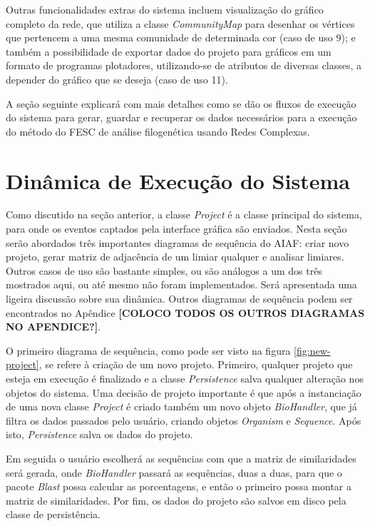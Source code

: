 Outras funcionalidades extras do sistema incluem visualização do gráfico completo da rede, que utiliza a classe \textit{CommunityMap} para desenhar
os vértices que pertencem a uma mesma comunidade de determinada cor (caso de uso 9); e também a possibilidade de exportar dados do projeto para
gráficos em um formato de programas plotadores, utilizando-se de atributos de diversas classes, a depender do gráfico que se deseja (caso de uso 11).

A seção seguinte explicará com mais detalhes como se dão os fluxos de execução do sistema para gerar, guardar e recuperar os dados necessários para a
execução do método do FESC de análise filogenética usando Redes Complexas.

\section{Dinâmica de Execução do Sistema} \label{sec:dinamica}

Como discutido na seção anterior, a classe \textit{Project} é a classe principal do sistema, para onde os eventos captados pela interface gráfica são
enviados. Nesta seção serão abordados três importantes diagramas de sequência do AIAF: criar novo projeto, gerar matriz de adjacência de um limiar qualquer
e analisar limiares. Outros casos de uso são bastante simples, ou são análogos a um dos três mostrados aqui, ou até mesmo não foram implementados. Será
apresentada uma ligeira discussão sobre sua dinâmica. Outros diagramas de sequência podem ser encontrados no Apêndice \textbf{[COLOCO TODOS OS OUTROS
DIAGRAMAS NO APENDICE?]}.

O primeiro diagrama de sequência, como pode ser visto na figura \ref{fig:new-project}, se refere à criação de um novo projeto. Primeiro, qualquer projeto
que esteja em execução é finalizado e a classe \textit{Persistence} salva qualquer alteração nos objetos do sistema. Uma decisão de projeto importante
é que após a instanciação de uma nova classe \textit{Project} é criado também um novo objeto \textit{BioHandler}, que já filtra os dados passados pelo
usuário, criando objetos \textit{Organism} e \textit{Sequence}. Após isto, \textit{Persistence} salva os dados do projeto.

Em seguida o usuário escolherá as sequências com que a matriz de similaridades será gerada, onde \textit{BioHandler} passará as sequências, duas a duas,
para que o pacote \textit{Blast} possa calcular as porcentagens, e então o primeiro possa montar a matriz de similaridades. Por fim, os dados do projeto
são salvos em disco pela classe de persistência. \newline

